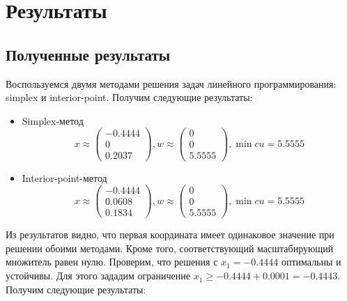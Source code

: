 \section{Результаты}
\subsection{Полученные результаты}
Воспользуемся двумя методами решения задач линейного программирования: simplex и interior-point. Получим следующие результаты:
\begin{itemize}
	\item Simplex-метод \\
		\begin{equation}
			x \approx
			\begin{pmatrix}
				-0.4444 \\
				0 \\
				0.2037
			\end{pmatrix}, w \approx \begin{pmatrix}
				0 \\
				0 \\
				5.5555
			\end{pmatrix}, \min c u = 5.5555
		\end{equation}
	
	\item Interior-point-метод \\
		\begin{equation}
			x \approx
			\begin{pmatrix}
				-0.4444 \\
				0.0608 \\
				0.1834
			\end{pmatrix}, w \approx \begin{pmatrix}
				0 \\
				0 \\
				5.5555
			\end{pmatrix}, \min c u = 5.5555
		\end{equation}
\end{itemize}
Из результатов видно, что первая координата имеет одинаковое значение при решении обоими методами. Кроме того, соответствующий масштабирующий множитель равен нулю. Проверим, что решения с $x_1=-0.4444$ оптимальны и устойчивы. Для этого зададим ограничение $x_1 \geq -0.4444 + 0.0001=-0.4443$. Получим следующие результаты:
